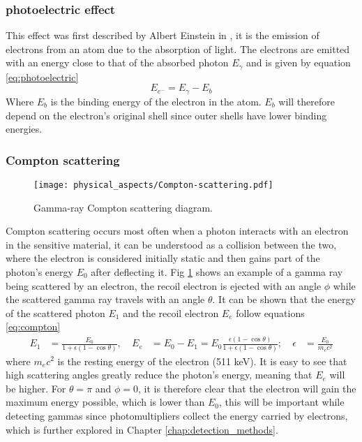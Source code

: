 \subsubsection{photoelectric effect}

This effect was first described by Albert Einstein in \cite{einstein1905heuristic}, it is the emission of electrons from an atom due to the absorption of light. The electrons are emitted with an energy close to that of the absorbed photon $E_\gamma$ and is given by equation \eqref{eq:photoelectric}
\begin{equation}
  E_{e^-} = E_\gamma - E_b \label{eq:photoelectric}
\end{equation}
Where $E_b$ is the binding energy of the electron in the atom. $E_b$ will therefore depend on the electron's original shell since outer shells have lower binding energies.

\subsubsection{Compton scattering}

\begin{figure}[H]
  \centering
  \texttt{[image: physical\_aspects/Compton-scattering.pdf]}
  \caption{\label{fig:Compton_scattering_diagram}Gamma-ray Compton scattering diagram.}
\end{figure}

Compton scattering occurs most often when a photon interacts with an electron in the sensitive material, it can be understood as a collision between the two, where the electron is considered initially static and then gains part of the photon's energy $E_0$ after deflecting it. Fig \ref{fig:Compton_scattering_diagram} shows an example of a gamma ray being scattered by an electron, the recoil electron is ejected with an angle $\phi$ while the scattered gamma ray travels with an angle $\theta$. It can be shown that the energy of the scattered photon $E_{1}$ and the recoil electron $E_e$ follow equations \eqref{eq:compton}
\begin{align}
  E_{1} &= \frac{E_0}{1+\epsilon(1-\cos\theta)} \label{eq:compton},~ & E_e &= E_0 - E_1 = E_0\frac{\epsilon(1-\cos\theta)}{1+\epsilon(1-\cos\theta)};~ & \epsilon&=\frac{E_0}{m_{e}c^2} 
\end{align}
where $m_e c^2$ is the resting energy of the electron (511 \unit{\kilo\eV}). It is easy to see that high scattering angles greatly reduce the photon's energy, meaning that $E_e$ will be higher. For $\theta=\pi$ and $\phi=0$, it is therefore clear that the electron will gain the maximum energy possible, which is lower than $E_0$, this will be important while detecting gammas since photomultipliers collect the energy carried by electrons, which is further explored in Chapter \ref{chap:detection_methods}.

